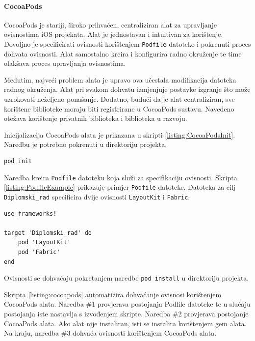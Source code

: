 \documentclass[times, utf8, diplomski, numeric]{fer}
\begin{document}
\paragraph{CocoaPods}

CocoaPods je stariji, široko prihvaćen, centraliziran alat za upravljanje ovisnostima iOS projekata. Alat je jednostavan i intuitivan za korištenje. Dovoljno je specificirati ovisnosti korištenjem \verb|Podfile| datoteke i pokrenuti proces dohvata ovisnosti. Alat samostalno kreira i konfigurira radno okruženje te time olakšava proces upravljanja ovisnostima.

Međutim, najveći problem alata je upravo ova učestala modifikacija datoteka radnog okruženja. Alat pri svakom dohvatu izmjenjuje postavke izgranje što može uzrokovati neželjeno ponašanje. Dodatno, budući da je alat centraliziran, sve korištene biblioteke moraju biti registrirane u CocoaPods sustavu. Navedeno otežava korištenje privatnih biblioteka i biblioteka u razvoju.

Inicijalizacija CocoaPods alata je prikazana u skripti \ref{listing:CocoaPodsInit}. Naredbu je potrebno pokrenuti u direktoriju projekta.

\begin{lstlisting}[caption=Inicijalizacija CocoaPods alata, label=listing:CocoaPodsInit]
pod init
\end{lstlisting}

Naredba kreira \verb|Podfile| datoteku koja služi za specifikaciju ovisnosti. Skripta \ref{listing:PodfileExample} prikazuje primjer \verb|Podfile| datoteke. Datoteka za cilj \verb|Diplomski_rad| specificira dvije ovisnosti \verb|LayoutKit| i \verb|Fabric|.

\begin{lstlisting}[caption=Primjer Podfile datoteke, label=listing:PodfileExample]
use_frameworks!

target 'Diplomski_rad' do
    pod 'LayoutKit'
    pod 'Fabric'
end
\end{lstlisting}

Ovisnosti se dohvaćaju pokretanjem naredbe \verb|pod install| u direktoriju projekta.

Skripta \ref{listing:cocoapods} automatizira dohvaćanje ovisnosi korištenjem CocoaPods alata. Naredba \#1 provjerava postojanja Podfile datoteke te u slučaju postojanja iste nastavlja s izvođenjem skripte. Naredba \#2 provjerava postojanje CocoaPods alata. Ako alat nije instaliran, isti se instalira korištenjem gem alata. Na kraju, naredba \#3 dohvaća ovisnosti korištenjem CocoaPods alata.
\end{document}
